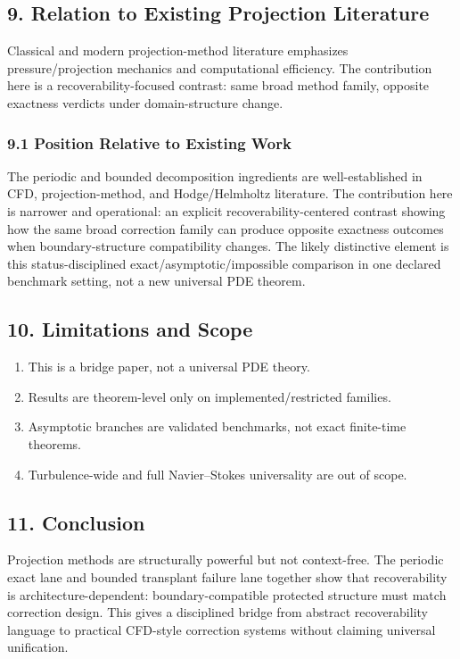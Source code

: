 \documentclass[11pt]{article}
\begin{document}
\subsection*{9. Relation to Existing Projection Literature}
Classical and modern projection-method literature emphasizes pressure/projection mechanics and computational efficiency. The contribution here is a recoverability-focused contrast: same broad method family, opposite exactness verdicts under domain-structure change.


\subsubsection*{9.1 Position Relative to Existing Work}
The periodic and bounded decomposition ingredients are well-established in CFD, projection-method, and Hodge/Helmholtz literature. The contribution here is narrower and operational: an explicit recoverability-centered contrast showing how the same broad correction family can produce opposite exactness outcomes when boundary-structure compatibility changes. The likely distinctive element is this status-disciplined exact/asymptotic/impossible comparison in one declared benchmark setting, not a new universal PDE theorem.


\subsection*{10. Limitations and Scope}
\begin{enumerate}
\item This is a bridge paper, not a universal PDE theory.
\item Results are theorem-level only on implemented/restricted families.
\item Asymptotic branches are validated benchmarks, not exact finite-time theorems.
\item Turbulence-wide and full Navier–Stokes universality are out of scope.
\end{enumerate}

\subsection*{11. Conclusion}
Projection methods are structurally powerful but not context-free. The periodic exact lane and bounded transplant failure lane together show that recoverability is architecture-dependent: boundary-compatible protected structure must match correction design. This gives a disciplined bridge from abstract recoverability language to practical CFD-style correction systems without claiming universal unification.
\end{document}
